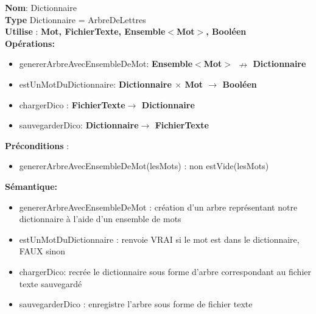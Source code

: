 \textbf{Nom}: Dictionnaire\\
    \textbf{Type} Dictionnaire = ArbreDeLettres \\
    \textbf{Utilise} : \textbf{Mot, FichierTexte, Ensemble$<$Mot$>$, Booléen}\\
    \textbf{Opérations:} \begin{itemize}[label=$\ $, leftmargin=2cm, itemsep=0cm]
        \item genererArbreAvecEnsembleDeMot: \textbf{Ensemble$<$Mot$>$ $\nrightarrow $ Dictionnaire}
        \item estUnMotDuDictionnaire: \textbf{Dictionnaire $\times$ Mot $\rightarrow $ Booléen}
        \item chargerDico : \textbf{FichierTexte$ \rightarrow$ Dictionnaire}
        \item sauvegarderDico: \textbf{Dictionnaire$\rightarrow$ FichierTexte}
        
    \end{itemize}
    \textbf{Préconditions} :
    \begin{itemize}[label=$\ $, leftmargin=2cm, itemsep=0cm]
     	\item genererArbreAvecEnsembleDeMot(lesMots) : non estVide(lesMots)
    \end{itemize}
    \textbf{Sémantique: }\begin{itemize}[label=$\- $, leftmargin=2cm, itemsep=0cm]
        \item genererArbreAvecEnsembleDeMot : création d'un arbre représentant notre dictionnaire à l'aide d'un ensemble de mots
        \item estUnMotDuDictionnaire : renvoie VRAI si le mot est dans le dictionnaire, FAUX sinon
        \item chargerDico: recrée le dictionnaire sous forme d'arbre correspondant au fichier texte sauvegardé
        \item sauvegarderDico : enregistre l'arbre sous forme de fichier texte
    \end{itemize}